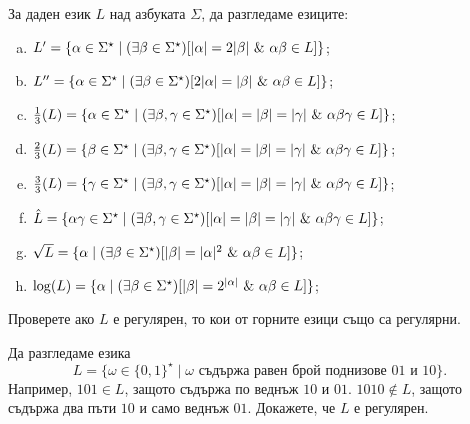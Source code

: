 \begin{problem}
  За даден език $L$ над азбуката $\Sigma$, да разгледаме езиците:
  \begin{enumerate}[a)]
  \item
    $L' = \{\alpha \in \Sigma^\star \mid (\exists \beta\in\Sigma^\star)[\abs{\alpha} = 2\abs{\beta}\ \&\ \alpha\beta \in L]\}$;
  \item 
    $L'' = \{\alpha \in \Sigma^\star \mid (\exists \beta\in\Sigma^\star)[2\abs{\alpha} = \abs{\beta}\ \&\ \alpha\beta \in L]\}$;
  \item 
    $\frac{1}{3}(L) = \{\alpha \in \Sigma^\star \mid (\exists \beta,\gamma \in \Sigma^\star)[\lvert{\alpha}\rvert = \lvert{\beta}\rvert = \lvert{\gamma}\rvert\ \&\ \alpha\beta\gamma \in L]\}$;
  \item
    $\frac{2}{3}(L) = \{\beta \in \Sigma^\star \mid (\exists \beta,\gamma \in \Sigma^\star)[\lvert{\alpha}\rvert = \lvert{\beta}\rvert = \lvert{\gamma}\rvert\ \&\ \alpha\beta\gamma \in L]\}$;
  \item
    $\frac{3}{3}(L) = \{\gamma \in \Sigma^\star \mid (\exists \beta,\gamma \in \Sigma^\star)[\lvert{\alpha}\rvert = \lvert{\beta}\rvert = \lvert{\gamma}\rvert\ \&\ \alpha\beta\gamma \in L]\}$;
  \item
    $\hat{L} = \{\alpha\gamma \in \Sigma^\star \mid (\exists \beta,\gamma \in \Sigma^\star)[\lvert{\alpha}\rvert = \lvert{\beta}\rvert = \lvert{\gamma}\rvert\ \&\ \alpha\beta\gamma \in L]\}$;
  \item
    $\sqrt{L} = \{\alpha \mid (\exists \beta \in \Sigma^\star)[\abs{\beta} = \abs{\alpha}^2\ \&\ \alpha\beta \in L]\}$;
  \item
    $\log(L) = \{\alpha \mid (\exists \beta \in \Sigma^\star)[\lvert{\beta}\rvert = 2^{\lvert{\alpha}\rvert}\ \&\ \alpha\beta \in L]\}$;
  \end{enumerate}
  Проверете ако $L$ е регулярен, то кои от горните езици също са регулярни.
\end{problem}

\begin{problem}
  Да разгледаме езика
  \[L = \{\omega \in \{0,1\}^\star \mid \omega\text{ съдържа равен брой поднизове }01\text{ и }10\}.\]
  Например, $101 \in L$, защото съдържа по веднъж $10$ и $01$.
  $1010 \not\in  L$, защото съдържа два пъти $10$ и само веднъж $01$.
  Докажете, че $L$ е регулярен.
\end{problem}


